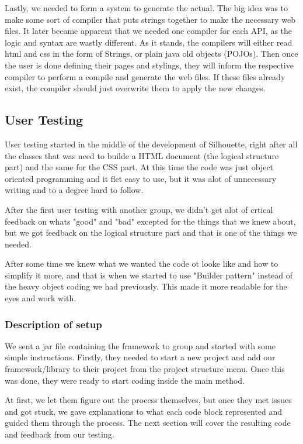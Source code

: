 \documentclass[12pt]{article}
\begin{document}
    Lastly, we needed to form a system to generate the actual. The big idea was to make some sort of compiler that puts strings together to make the necessary web files. It later became apparent that we needed one compiler for each API, as the logic and syntax are wastly different. As it stands, the compilers will either read html and css in the form of Strings, or plain java old objects (POJOs). Then once the user is done defining their pages and stylings, they will inform the respective compiler to perform a compile and generate the web files. If these files already exist, the compiler should just overwrite them to apply the new changes.


    \subsection{User Testing}
    User testing started in the middle of the development of Silhouette, right after all the classes that was need to builde a HTML document (the logical structure part) and the same for the CSS part. At this time the code was just object oriented programming and it flet easy to use, but it was alot of unnecessary writing and to a degree hard to follow.   
        
    After the first user testing with another group, we didn't get alot of crtical feedback on whats "good" and "bad" excepted for the things that we knew about, but we got feedback on the logical structure part and that is one of the things we needed.
        
    After some time we knew what we wanted the code ot looke like and how to simplify it more, and that is when we started to use "Builder pattern" instead of the heavy object coding we had previously. This made it more readable for the eyes and work with.

        \subsubsection{Description of setup}
        We sent a jar file containing the framework to group and started with some simple instructions. Firstly, they needed to start a new project and add our framework/library to their project from the project structure menu. Once this was done, they were ready to start coding inside the main method.
        
        At first, we let them figure out the process themselves, but once they met issues and got stuck, we gave explanations to what each code block represented and guided them through the process. The next section will cover the resulting code and feedback from our testing.
\end{document}

